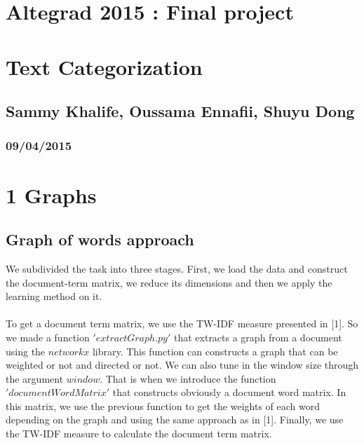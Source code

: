 
\geometry{hmargin=2.5cm,vmargin=2cm}   


\begin{center}

\section*{Altegrad 2015 : Final project}
\section*{Text Categorization}
\subsection*{Sammy Khalife, Oussama Ennafii, Shuyu Dong}
\subsubsection*{09/04/2015}

\end{center}

\section*{1 Graphs}
\subsection*{Graph of words approach}

We subdivided the task into three stages. First, we load the data and construct the document-term matrix, we reduce its dimensions and then we apply the learning method on it.~\\
~\\
To get a document term matrix, we use the TW-IDF measure presented in [1]. So we made a function $'extractGraph.py'$ that extracts a graph from a document using the $networkx$ library. This function can constructs a graph that can be weighted or not and directed or not. We can also tune in the window size through the argument $window$. That is when we introduce the function $'documentWordMatrix'$ that constructs obviously a document word matrix. In this matrix, we use the previous function to get the weights of each word depending on the graph and using the same approach as in [1]. Finally, we use the TW-IDF measure to calculate the document term matrix.\\

